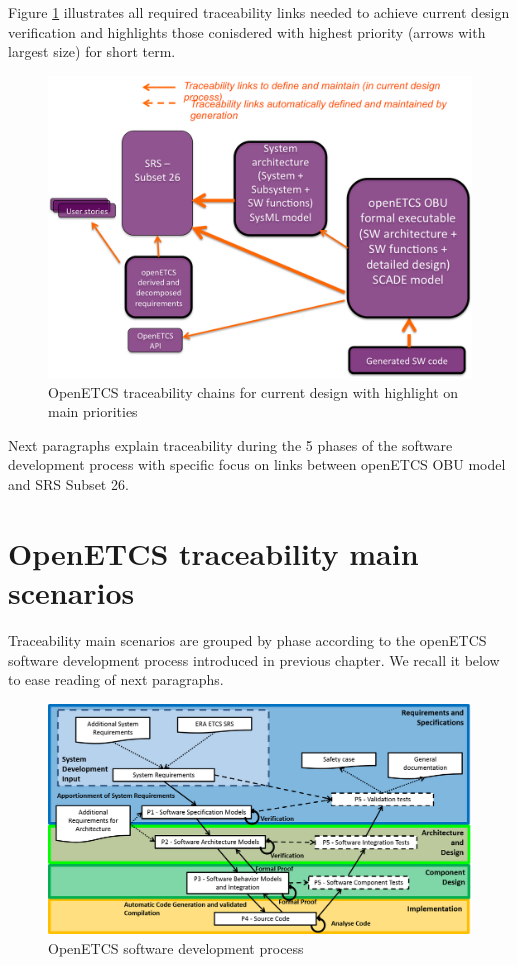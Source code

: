 \documentclass[11pt]{template/openetcs_report}
\begin{document}
Figure \ref{fig:openETCSTraceabilityMainPriority} illustrates all required traceability links needed to achieve current design verification and highlights those conisdered with highest priority (arrows with largest size) for short term.

\begin{figure}[htbp]
\centering
\includegraphics[width=.9\linewidth]
{./images/openETCSTraceabilityMainPriority.png}
\caption{\label{fig:openETCSTraceabilityMainPriority}OpenETCS traceability chains for current design with highlight on main priorities}
\end{figure}

Next paragraphs explain traceability during the 5 phases of the software development process with specific focus on links between openETCS OBU model and SRS Subset 26.


\section{OpenETCS traceability main scenarios}
Traceability main scenarios are grouped by phase according to the openETCS software development process introduced in previous chapter. We recall it below to ease reading of next paragraphs.

\begin{figure} [htbp]
\centering
\includegraphics[width=.9\linewidth]
{./images/OpenETCSDevelopmentProcess.png}
\caption{\label{fig:OpenETCSDevelopmentProcess}OpenETCS software development process}
\end{figure} 
\end{document}
